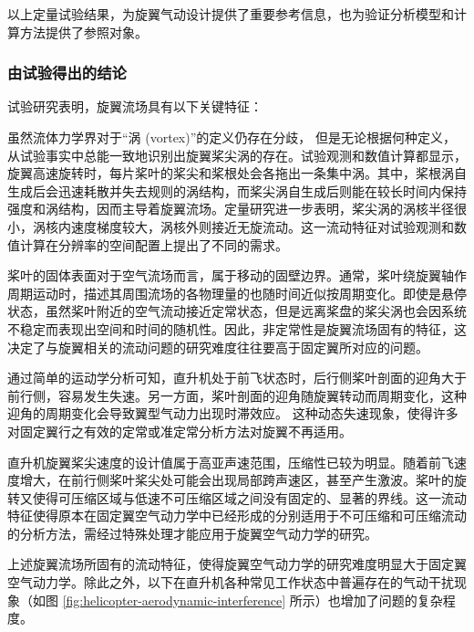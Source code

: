 以上定量试验结果，为旋翼气动设计提供了重要参考信息，也为验证分析模型和计算方法提供了参照对象。

\subsubsection{由试验得出的结论}

试验研究表明，旋翼流场具有以下关键特征： 
\begin{description}[wide]
\item [{桨尖涡主导}] 虽然流体力学界对于“涡 (vortex)”的定义仍存在分歧， 但是无论根据何种定义，从试验事实中总能一致地识别出旋翼桨尖涡的存在。试验观测和数值计算都显示，旋翼高速旋转时，每片桨叶的桨尖和桨根处会各拖出一条集中涡。其中，桨根涡自生成后会迅速耗散并失去规则的涡结构，而桨尖涡自生成后则能在较长时间内保持强度和涡结构，因而主导着旋翼流场。定量研究进一步表明，桨尖涡的涡核半径很小，涡核内速度梯度较大，涡核外则接近无旋流动。这一流动特征对试验观测和数值计算在分辨率的空间配置上提出了不同的需求。 
\item [{非定常}] 桨叶的固体表面对于空气流场而言，属于移动的固壁边界。通常，桨叶绕旋翼轴作周期运动时，描述其周围流场的各物理量的也随时间近似按周期变化。即使是悬停状态，虽然桨叶附近的空气流动接近定常状态，但是远离桨盘的桨尖涡也会因系统不稳定而表现出空间和时间的随机性。因此，非定常性是旋翼流场固有的特征，这决定了与旋翼相关的流动问题的研究难度往往要高于固定翼所对应的问题。 
\item [{动态失速}] 通过简单的运动学分析可知，直升机处于前飞状态时，后行侧桨叶剖面的迎角大于前行侧，容易发生失速。另一方面，桨叶剖面的迎角随旋翼转动而周期变化，这种迎角的周期变化会导致翼型气动力出现时滞效应。
这种动态失速现象，使得许多对固定翼行之有效的定常或准定常分析方法对旋翼不再适用。
\item [{局部可压缩}] 直升机旋翼桨尖速度的设计值属于高亚声速范围，压缩性已较为明显。随着前飞速度增大，在前行侧桨叶桨尖处可能会出现局部跨声速区，甚至产生激波。桨叶的旋转又使得可压缩区域与低速不可压缩区域之间没有固定的、显著的界线。这一流动特征使得原本在固定翼空气动力学中已经形成的分别适用于不可压缩和可压缩流动的分析方法，需经过特殊处理才能应用于旋翼空气动力学的研究。 
\end{description}
%
上述旋翼流场所固有的流动特征，使得旋翼空气动力学的研究难度明显大于固定翼空气动力学。除此之外，以下在直升机各种常见工作状态中普遍存在的气动干扰现象（如图
\ref{fig:helicopter-aerodynamic-interference} 所示）也增加了问题的复杂程度。
